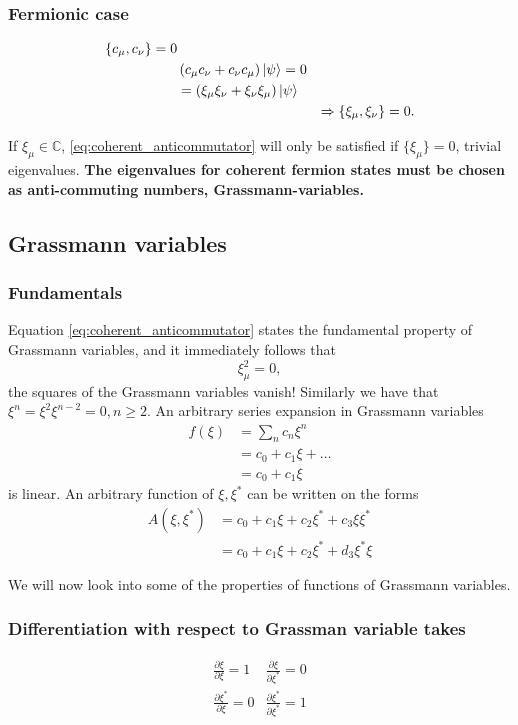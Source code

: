 \subsubsection{Fermionic case}
\begin{align}
\{c_\mu, c_\nu\} = 0 && \nonumber \\
&\left(c_\mu c_\nu + c_\nu c_\mu\right)\ket{\psi} = 0 &\nonumber \\
&=\left(\xi_\mu\xi_\nu + \xi_\nu\xi_\mu\right)\ket{\psi} &\nonumber \\
&&\Rightarrow \{\xi_\mu,\xi_\nu\} = 0.\label{eq:coherent_anticommutator}
\end{align}

If $\xi_\mu\in\mathbb{C}$, \eqref{eq:coherent_anticommutator} will only be satisfied if $\{\xi_\mu\} = 0$, trivial eigenvalues. \textbf{The eigenvalues for coherent fermion states must be chosen as anti-commuting numbers, Grassmann-variables.}

\subsection{Grassmann variables}
\subsubsection{Fundamentals}
	
Equation \eqref{eq:coherent_anticommutator} states the fundamental property of Grassmann variables, and it immediately follows that 
\begin{equation}
\xi_\mu^2 = 0,
\end{equation}
the squares of the Grassmann variables vanish!
Similarly we have that $\xi^n = \xi^2\xi^{n-2} = 0, n \ge 2$.
An arbitrary series expansion in Grassmann variables
\begin{align}
f(\xi) &= \sum_nc_n\xi^n \nonumber \\
&=c_0 + c_1\xi + \dots \nonumber\\
&= c_0 + c_1\xi
\end{align}
is linear.
An arbitrary function of $\xi, \xi^*$ can be written on the forms
\begin{align*}
A\left(\xi, \xi^*\right) &= c_0 + c_1\xi + c_2\xi^*+c_3\xi\xi^* \\
&= c_0 + c_1\xi + c_2\xi^*+d_3\xi^*\xi
\end{align*}

We will now look into some of the properties of functions of Grassmann variables.
\subsubsection{Differentiation with respect to Grassman variable takes}


\begin{align}
&\frac{\partial \xi}{\partial \xi} = 1 & \frac{\partial \xi}{\partial \xi^*} = 0 & \\
&\frac{\partial \xi^*}{\partial\xi} = 0 & \frac{\partial \xi^*}{\partial \xi^*} = 1 &
\end{align}